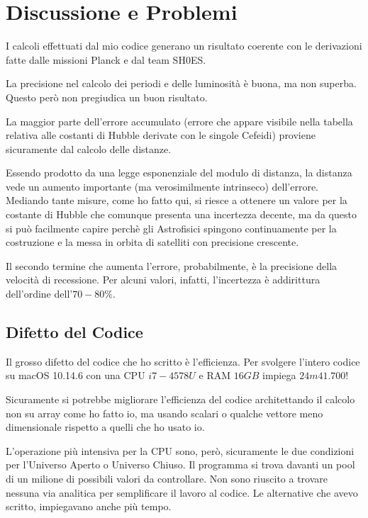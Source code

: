\documentclass{article}
\begin{document}
\section{Discussione e Problemi}

I calcoli effettuati dal mio codice generano un risultato coerente con
le derivazioni fatte dalle missioni Planck e dal team SH0ES.

La precisione nel calcolo dei periodi e delle luminosità è buona, ma
non superba. Questo però non pregiudica un buon risultato.

La maggior parte dell'errore accumulato (errore che appare visibile nella tabella
relativa alle costanti di Hubble derivate con le singole Cefeidi)
proviene sicuramente dal calcolo delle distanze.

Essendo prodotto da una legge esponenziale del modulo di distanza, la
distanza vede un aumento importante (ma verosimilmente intrinseco)
dell'errore. Mediando tante misure, come ho fatto qui, si riesce a
ottenere un valore per la costante di Hubble che comunque presenta una
incertezza decente, ma da questo si può facilmente capire perchè gli
Astrofisici spingono continuamente per la costruzione e la messa in
orbita di satelliti con precisione crescente.

Il secondo termine che aumenta l'errore, probabilmente, è la
precisione della velocità di recessione. Per alcuni valori, infatti,
l'incertezza è addirittura dell'ordine dell'$70-80\%$.

\subsection{Difetto del Codice}

Il grosso difetto del codice che ho scritto è l'efficienza. Per
svolgere l'intero codice su macOS 10.14.6 con una CPU $i7 - 4578U$ e
RAM $16GB$ impiega $24m41.700$!

Sicuramente si potrebbe migliorare l'efficienza del codice
architettando il calcolo non su array come ho fatto io, ma usando
scalari o qualche vettore meno dimensionale rispetto a quelli che ho
usato io.

L'operazione più intensiva per la CPU sono, però, sicuramente le due condizioni per l'Universo Aperto o Universo
Chiuso. Il programma si trova davanti un pool di un milione di
possibili valori da controllare. Non sono riuscito a trovare nessuna
via analitica per semplificare il lavoro al codice. Le alternative che
avevo scritto, impiegavano anche più tempo.
\end{document}
